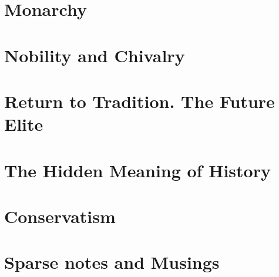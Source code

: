 \documentclass[a4paper,12pt,twoside]{book}
\begin{document}
\chapter{Monarchy}


\chapter{Nobility and Chivalry}






\chapter{Return to Tradition. The Future Elite}






\chapter{The Hidden Meaning of History}





\chapter{Conservatism}



\chapter{Sparse notes and Musings}



\end{document}
